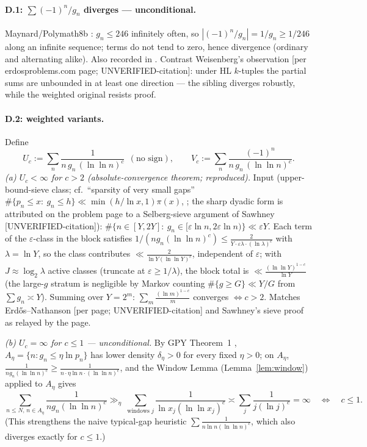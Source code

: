 \documentclass[11pt]{article}
\theoremstyle{definition}
\begin{document}
\paragraph{D.1: $\sum(-1)^n/g_n$ diverges --- unconditional.}
Maynard/Polymath8b \cite{Ma15,Po14}: $g_n\le246$ infinitely often, so $|(-1)^n/g_n|=1/g_n\ge1/246$ along an infinite sequence; terms do not tend to zero, hence divergence (ordinary and alternating alike). Also recorded in \cite[\S5]{Ta23}. Contrast Weisenberg's observation [per erdosproblems.com page; UNVERIFIED-citation]: under HL $k$-tuples the partial sums are unbounded in at least one direction --- the sibling diverges robustly, while the weighted original resists proof.

\paragraph{D.2: weighted variants.}
Define
\[
U_c:=\sum_n\frac{1}{n\,g_n\,(\ln\ln n)^c}\ \ (\text{no sign}),\qquad
V_c:=\sum_n\frac{(-1)^n}{n\,g_n\,(\ln\ln n)^c}.
\]
\emph{(a) $U_c<\infty$ for $c>2$ (absolute-convergence theorem; reproduced).} Input (upper-bound-sieve class; cf.\ ``sparsity of very small gaps'' $\#\{p_n\le x:\ g_n\le h\}\ll\min(h/\ln x,1)\pi(x)$, \cite[Thm~2]{GPY11}; the sharp dyadic form is attributed on the problem page to a Selberg-sieve argument of Sawhney [UNVERIFIED-citation]):
$\#\{n\in[Y,2Y]:\ g_n\in[\varepsilon\ln n,2\varepsilon\ln n)\}\ll\varepsilon Y.$
Each term of the $\varepsilon$-class in the block satisfies $1/(ng_n(\ln\ln n)^c)\le\frac{2}{Y\cdot\varepsilon\lambda\cdot(\ln\lambda)^c}$ with $\lambda=\ln Y$, so the class contributes $\ll\frac{2}{\ln Y(\ln\ln Y)^c}$, independent of $\varepsilon$; with $J\approx\log_2\lambda$ active classes (truncate at $\varepsilon\ge1/\lambda$), the block total is
$\ll\frac{(\ln\ln Y)^{1-c}}{\ln Y}$
(the large-$g$ stratum is negligible by Markov counting $\#\{g\ge G\}\ll Y/G$ from $\sum g_n\asymp Y$). Summing over $Y=2^m$: $\sum_m\frac{(\ln m)^{1-c}}{m}$ converges $\iff c>2$. Matches Erd\H{o}s--Nathanson [per page; UNVERIFIED-citation] and Sawhney's sieve proof as relayed by the page.

\emph{(b) $U_c=\infty$ for $c\le1$ --- unconditional.} By GPY Theorem~1 \cite{GPY11}, $A_\eta=\{n:g_n\le\eta\ln p_n\}$ has lower density $\delta_\eta>0$ for every fixed $\eta>0$; on $A_\eta$, $\frac{1}{ng_n(\ln\ln n)^c}\ge\frac{1}{n\cdot\eta\ln n\cdot(\ln\ln n)^c}$, and the Window Lemma (Lemma~\ref{lem:window}) applied to $A_\eta$ gives
\[
\sum_{n\le N,\,n\in A_\eta}\frac{1}{ng_n(\ln\ln n)^c}
\gg_\eta\ \sum_{\text{windows }j}\frac{1}{\ln x_j(\ln\ln x_j)^c}
\asymp\sum_j\frac{1}{j(\ln j)^c}=\infty\quad\iff\quad c\le1 .
\]
(This strengthens the naive typical-gap heuristic $\sum\frac{1}{n\ln n(\ln\ln n)^c}$, which also diverges exactly for $c\le1$.)
\end{document}
